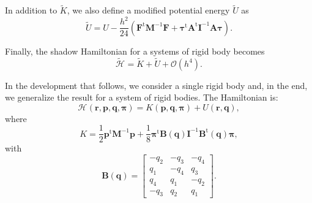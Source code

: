 \documentclass[
journal=jctcce,
layout=twocolumn
]{achemso}
\newcommand{\mt}[1]{\boldsymbol{\mathbf{#1}}}   %
\newcommand{\vt}[1]{\boldsymbol{\mathbf{#1}}}   %
\newcommand{\tr}[1]{#1^\text{t}}                %
\newcommand{\Ham}[1]{{\mathcal H}_\text{#1}}    %
\newcommand{\timestep}{h}
\newcommand{\modified}[1]{\widetilde{#1}}
\begin{document}
In addition to $\modified K$, we also define a modified potential energy $\modified U$ as
\begin{equation*}
\modified U = U - \frac{\timestep^2}{24} \left( \tr{\vt F} {\mt M}^{-1} {\vt F} + \tr{\vt \tau} \tr{\mt A} {\mt I}^{-1} {\mt A} {\vt \tau} \right).
\end{equation*}

Finally, the shadow Hamiltonian for a systems of rigid body becomes
\begin{equation}
\modified{\Ham{}} = \modified K + \modified U + \mathcal{O}(h^4).
\end{equation}

In the development that follows, we consider a single rigid body and, in the end, we generalize the result for a system of rigid bodies.
The Hamiltonian is:
\begin{equation*}
\Ham{}(\vt r, \vt p, \vt q, \vt \pi) = K(\vt p, \vt q, \vt \pi) + U(\vt r, \vt q),
\end{equation*}
where
\begin{equation*}
K = \frac{1}{2} \tr{\vt p}{\mt M}^{-1}{\vt p} + \frac{1}{8}\tr{\vt \pi} {\mt B}(\vt q) {\mt I}^{-1} \tr{\mt B}(\vt q) \vt \pi,
\end{equation*}
with
\begin{equation*}
\mt B(\vt q) = \left[\begin{array}{rrrr}
-q_2 & -q_3 & -q_4 \\
q_1 & -q_4 &  q_3 \\
q_4 &  q_1 & -q_2 \\
-q_3 &  q_2 &  q_1
\end{array}\right].
\end{equation*}
\end{document}
